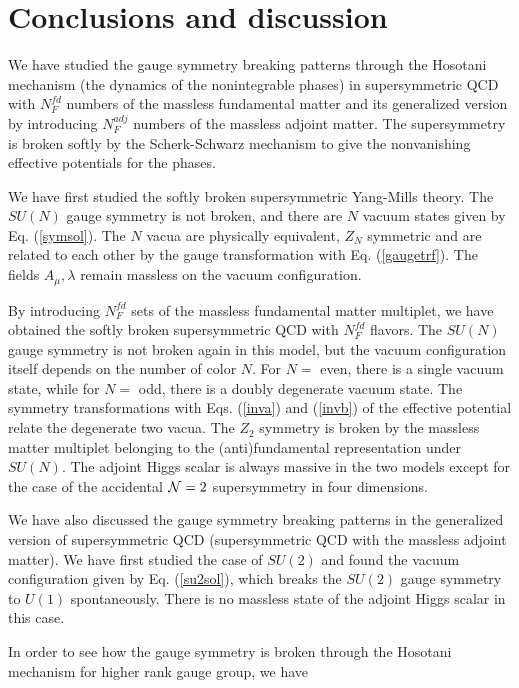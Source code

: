 \documentclass[a4paper,12pt]{article}
\begin{document}
{\section{Conclusions and discussion}
We have studied the gauge symmetry breaking patterns through the Hosotani
mechanism (the dynamics of the nonintegrable phases) in supersymmetric 
QCD with $N_F^{fd}$ numbers of the massless fundamental matter and 
its generalized version by introducing $N_F^{adj}$ numbers of the 
massless adjoint matter. The supersymmetry is broken softly by
the Scherk-Schwarz mechanism to give the nonvanishing effective potentials
for the phases.
\par
We have first studied the softly broken supersymmetric Yang-Mills 
theory. The $SU(N)$ gauge symmetry is not 
broken, and there are $N$ vacuum states given 
by Eq. (\ref{symsol}). The $N$ vacua are
physically equivalent, $Z_N$ symmetric and are 
related to each other by the 
gauge transformation with Eq. (\ref{gaugetrf}).  
The fields $A_{\mu}, \lambda$ remain massless
on the vacuum configuration.
\par
By introducing $N_F^{fd}$ sets of the massless 
fundamental matter multiplet, we have obtained 
the softly broken supersymmetric QCD with $N_F^{fd}$ flavors. 
The $SU(N)$ gauge symmetry is not 
broken again in this model, but the vacuum configuration itself 
depends on the number of
color $N$. For $N=$ even, there is a single vacuum state, while
for $N=$ odd, there is a doubly degenerate vacuum state.
The symmetry transformations with 
Eqs. (\ref{inva}) and (\ref{invb}) of the effective potential 
relate the degenerate two vacua. 
The $Z_2$ symmetry is broken by the 
massless matter multiplet belonging to the (anti)fundamental 
representation under $SU(N)$. The adjoint Higgs scalar is always massive
in the two models except for the case of the accidental ${\cal N}=2$
supersymmetry in four dimensions. 
\par
We have also discussed the gauge symmetry breaking patterns in 
the generalized version of supersymmetric 
QCD (supersymmetric QCD with the massless adjoint matter).
We have first studied the case of $SU(2)$ and found 
the vacuum configuration given by Eq. (\ref{su2sol}), which 
breaks the $SU(2)$ gauge symmetry to $U(1)$ spontaneously. 
There is no massless state of the adjoint Higgs scalar in this case.
\par
In order to see how the gauge symmetry is broken through
the Hosotani mechanism for higher rank gauge group, we have 
}
\end{document}
